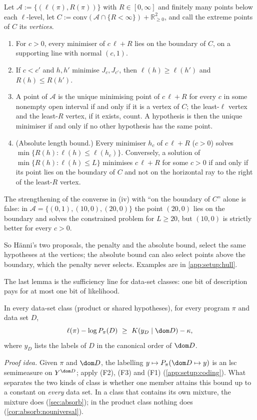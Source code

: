 \begin{lemma}\label{lem:setup:hull}
Let $\mathcal A:=\{(\ell(\pi),R(\pi))\}$ with $R\in[0,\infty]$ and finitely many points below each $\ell$-level, let $C:=\mathrm{conv}(\mathcal A\cap\{R<\infty\})+\mathbb R^2_{\ge0}$, and call the extreme points of $C$ its \emph{vertices}.
\begin{enumerate}[label=(\roman*)]
\item For $c>0$, every minimiser of $c\,\ell+R$ lies on the boundary of $C$, on a supporting line with normal $(c,1)$.
\item If $c<c'$ and $h,h'$ minimise $J_c,J_{c'}$, then $\ell(h)\ge\ell(h')$ and $R(h)\le R(h')$.
\item A point of $\mathcal A$ is the unique minimising point of $c\,\ell+R$ for every $c$ in some nonempty open interval if and only if it is a vertex of $C$; the least-$\ell$ vertex and the least-$R$ vertex, if it exists, count. A hypothesis is then the unique minimiser if and only if no other hypothesis has the same point.
\item (Absolute length bound.) Every minimiser $h_c$ of $c\,\ell+R$ ($c>0$) solves $\min\{R(h):\ell(h)\le\ell(h_c)\}$. Conversely, a solution of $\min\{R(h):\ell(h)\le L\}$ minimises $c\,\ell+R$ for some $c>0$ if and only if its point lies on the boundary of $C$ and not on the horizontal ray to the right of the least-$R$ vertex.
\end{enumerate}
The strengthening of the converse in (iv) with ``on the boundary of $C$'' alone is false: in $\mathcal A=\{(0,1),(10,0),(20,0)\}$ the point $(20,0)$ lies on the boundary and solves the constrained problem for $L\ge20$, but $(10,0)$ is strictly better for every $c>0$.
\end{lemma}

So H\"anni's two proposals, the penalty and the absolute bound, select the same hypotheses at the vertices; the absolute bound can also select points above the boundary, which the penalty never selects. Examples are in \cref{app:setup:hull}.

The last lemma is the sufficiency line for data-set classes: one bit of description pays for at most one bit of likelihood.

\begin{lemma}\label{lem:setup:coding}
In every data-set class (product or shared hypotheses), for every program $\pi$ and data set $D$,
\[
\ell(\pi)-\log P_\pi(D)\ \ge\ K(y_D\mid\dom D)-\kappa,
\]
where $y_D$ lists the labels of $D$ in the canonical order of $\dom D$.
\end{lemma}

\emph{Proof idea.} Given $\pi$ and $\dom D$, the labelling $y\mapsto P_\pi(\dom D\mapsto y)$ is an lsc semimeasure on $Y^{\dom D}$; apply (F2), (F3) and (F1) (\cref{app:setup:coding}). What separates the two kinds of class is whether one member attains this bound up to a constant on \emph{every} data set. In a class that contains its own mixture, the mixture does (\cref{sec:absorb}); in the product class nothing does (\cref{cor:absorb:nouniversal}).
